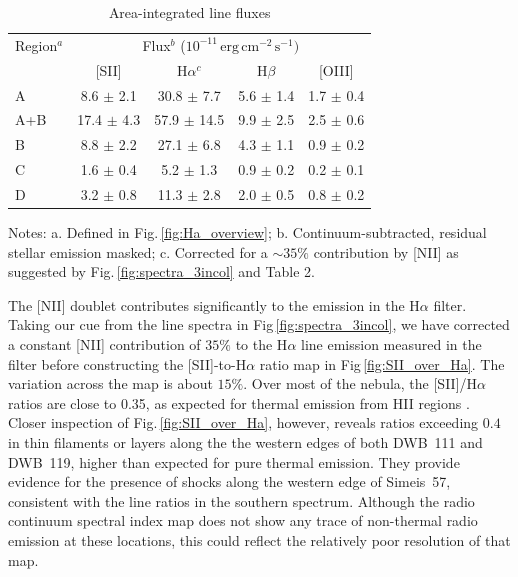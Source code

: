 \documentclass{aa}
\begin{document}
\begin{table}[h]
{\small %
  \caption{Area-integrated line fluxes}
  \label{tab:fluxes_info_from_maps}
\begin{center}
\begin{tabular}{lcccc}
\toprule
Region$^a$ & \multicolumn{4}{c}{Flux$^b$ ($10^{-11}\, \mathrm{erg\, cm^{-2}\,s^{-1})}$} \\
    &       [SII]  & H$\alpha^c$  &    H$\beta$  &  [OIII]        \\
\midrule
A   &   8.6 $\pm$ 2.1 &   30.8 $\pm$ 7.7 &  5.6 $\pm$ 1.4 &  1.7 $\pm$ 0.4 \\
A+B &  17.4 $\pm$ 4.3 &  57.9 $\pm$ 14.5 &  9.9 $\pm$ 2.5 &  2.5 $\pm$ 0.6 \\
B   &   8.8 $\pm$ 2.2 &   27.1 $\pm$ 6.8 &  4.3 $\pm$ 1.1 &  0.9 $\pm$ 0.2 \\
C   &   1.6 $\pm$ 0.4 &    5.2 $\pm$ 1.3 &  0.9 $\pm$ 0.2 &  0.2 $\pm$ 0.1 \\
D   &   3.2 $\pm$ 0.8 &   11.3 $\pm$ 2.8 &  2.0 $\pm$ 0.5 &  0.8 $\pm$ 0.2 \\
\bottomrule
  \end{tabular}
  \end{center}
Notes: a. Defined in Fig.\,\ref{fig:Ha_overview};
b. Continuum-subtracted, residual stellar emission masked;
c. Corrected for a $\sim35\%$ contribution by [NII] as suggested by
Fig.\,\ref{fig:spectra_3incol} and Table 2.
} %
\end{table}
\par The [NII] doublet contributes significantly to the emission in the
H$\alpha$ filter. Taking our cue from the line spectra in
Fig\,\ref{fig:spectra_3incol}, we have corrected a constant [NII]
contribution of $35\%$ to the H$\alpha$ line emission measured in the
filter before constructing the [SII]-to-H$\alpha$ ratio map in
Fig\,\ref{fig:SII_over_Ha}. The variation across the map is
about $15\%$. Over most of the nebula, the [SII]/H$\alpha$ ratios are
close to 0.35, as expected for thermal emission from HII regions
\citep[cf. Fig. 12 from ][]{Lagrois2012}. Closer inspection of
Fig.\,\ref{fig:SII_over_Ha}, however, reveals ratios exceeding $0.4$ in
thin filaments or layers along the the western edges of both DWB~111
and DWB~119, higher than expected for pure thermal emission. They
provide evidence for the presence of shocks along the western edge of
Simeis~57, consistent with the line ratios in the southern
spectrum. Although the radio continuum spectral index map 
\citep[Fig. 7 of ][]{israel2003} does not show any trace of non-thermal
radio emission at these locations, this could reflect the
relatively poor resolution of that map.
\end{document}
